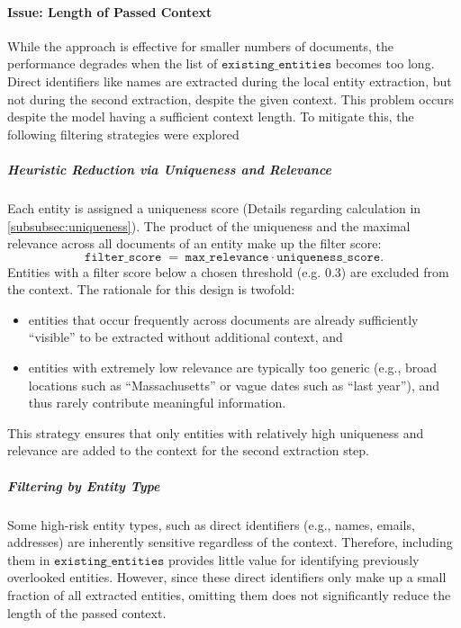 \paragraph{Issue: Length of Passed Context}
While the approach is effective for smaller numbers of documents, the performance degrades when the list of $\texttt{existing\_entities}$ becomes too long. Direct identifiers like names are extracted during the local entity extraction, but not during the second extraction, despite the given context. This problem occurs despite the model having a sufficient context length. To mitigate this, the following filtering strategies were explored %

\subparagraph{Heuristic Reduction via Uniqueness and Relevance}
Each entity is assigned a uniqueness score (Details regarding calculation in \ref{subsubsec:uniqueness}). The product of the uniqueness and the maximal relevance across all documents of an entity make up the filter score:
\[
    \texttt{filter\_score} \;=\; \texttt{max\_relevance} \cdot \texttt{uniqueness\_score}.
\]
Entities with a filter score below a chosen threshold (e.g. 0.3) are excluded from the context. The rationale for this design is twofold:
\begin{itemize} %
    \item entities that occur frequently across documents are already sufficiently ``visible'' to be extracted without additional context, and
    \item entities with extremely low relevance are typically too generic (e.g., broad locations such as ``Massachusetts'' or vague dates such as ``last year''), and thus rarely contribute meaningful information.
\end{itemize}
This strategy ensures that only entities with relatively high uniqueness and relevance are added to the context for the second extraction step.


\subparagraph{Filtering by Entity Type}
Some high-risk entity types, such as direct identifiers (e.g., names, emails, addresses) are inherently sensitive regardless of the context. Therefore, including them in $\texttt{existing\_entities}$ provides little value for identifying previously overlooked entities. However, since these direct identifiers only make up a small fraction of all extracted entities, omitting them does not significantly reduce the length of the passed context.

